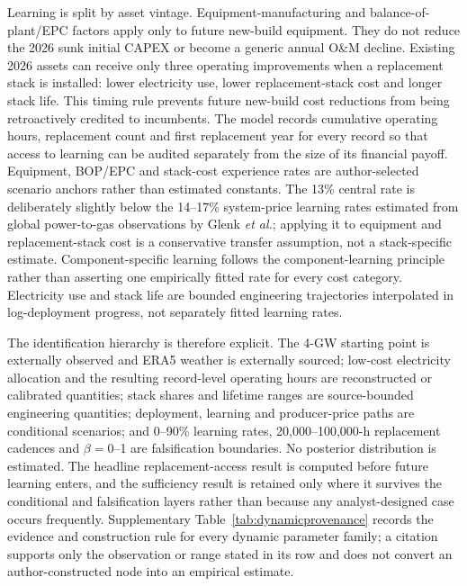 \documentclass[11pt,a4paper]{article}
\begin{document}
Learning is split by asset vintage. Equipment-manufacturing and balance-of-plant/EPC factors apply only to future new-build equipment. They do not reduce the 2026 sunk initial CAPEX or become a generic annual O\&M decline. Existing 2026 assets can receive only three operating improvements when a replacement stack is installed: lower electricity use, lower replacement-stack cost and longer stack life. This timing rule prevents future new-build cost reductions from being retroactively credited to incumbents. The model records cumulative operating hours, replacement count and first replacement year for every record so that access to learning can be audited separately from the size of its financial payoff. Equipment, BOP/EPC and stack-cost experience rates are author-selected scenario anchors rather than estimated constants. The 13\% central rate is deliberately slightly below the 14--17\% system-price learning rates estimated from global power-to-gas observations by Glenk \emph{et al.}\cite{glenk2023}; applying it to equipment and replacement-stack cost is a conservative transfer assumption, not a stack-specific estimate. Component-specific learning follows the component-learning principle rather than asserting one empirically fitted rate for every cost category\cite{ferioli2009,zeyen2023}. Electricity use and stack life are bounded engineering trajectories interpolated in log-deployment progress, not separately fitted learning rates\cite{doe2024,worldbank2026,iea2025}.

The identification hierarchy is therefore explicit. The 4-GW starting point is externally observed and ERA5 weather is externally sourced; low-cost electricity allocation and the resulting record-level operating hours are reconstructed or calibrated quantities; stack shares and lifetime ranges are source-bounded engineering quantities; deployment, learning and producer-price paths are conditional scenarios; and 0--90\% learning rates, 20,000--100,000-h replacement cadences and $\beta=0$--1 are falsification boundaries. No posterior distribution is estimated. The headline replacement-access result is computed before future learning enters, and the sufficiency result is retained only where it survives the conditional and falsification layers rather than because any analyst-designed case occurs frequently. Supplementary Table~\ref{tab:dynamicprovenance} records the evidence and construction rule for every dynamic parameter family; a citation supports only the observation or range stated in its row and does not convert an author-constructed node into an empirical estimate.
\end{document}
